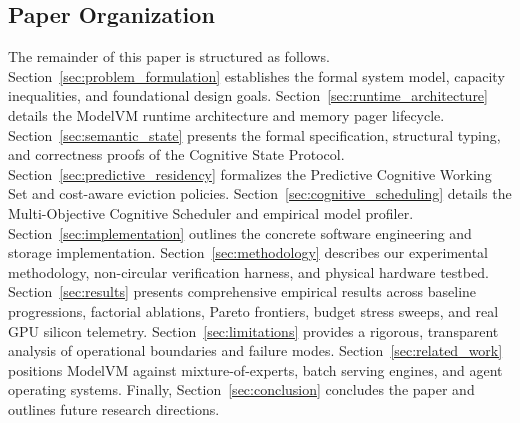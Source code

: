 \subsection{Paper Organization}
\label{sec:intro_organization}

The remainder of this paper is structured as follows. 
Section~\ref{sec:problem_formulation} establishes the formal system model, capacity inequalities, and foundational design goals. 
Section~\ref{sec:runtime_architecture} details the ModelVM runtime architecture and memory pager lifecycle. 
Section~\ref{sec:semantic_state} presents the formal specification, structural typing, and correctness proofs of the Cognitive State Protocol. 
Section~\ref{sec:predictive_residency} formalizes the Predictive Cognitive Working Set and cost-aware eviction policies. 
Section~\ref{sec:cognitive_scheduling} details the Multi-Objective Cognitive Scheduler and empirical model profiler. 
Section~\ref{sec:implementation} outlines the concrete software engineering and storage implementation. 
Section~\ref{sec:methodology} describes our experimental methodology, non-circular verification harness, and physical hardware testbed. 
Section~\ref{sec:results} presents comprehensive empirical results across baseline progressions, factorial ablations, Pareto frontiers, budget stress sweeps, and real GPU silicon telemetry. 
Section~\ref{sec:limitations} provides a rigorous, transparent analysis of operational boundaries and failure modes. 
Section~\ref{sec:related_work} positions ModelVM against mixture-of-experts, batch serving engines, and agent operating systems. 
Finally, Section~\ref{sec:conclusion} concludes the paper and outlines future research directions.

